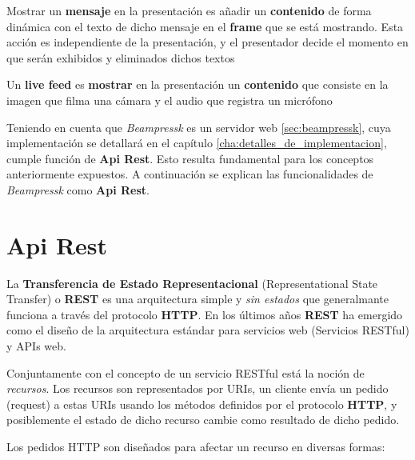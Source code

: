 	\begin{definition}
	\label{def:message}
		Mostrar un \textbf{mensaje} en la presentación es añadir un \textbf{contenido} de forma dinámica con el texto de dicho mensaje en el \textbf{frame} que se está mostrando. Esta acción es independiente de la presentación, y el presentador decide el momento en que serán exhibidos y eliminados dichos textos
	\end{definition}

	\begin{definition}
		Un \textbf{live feed} es \textbf{mostrar} en la presentación un \textbf{contenido} que consiste en la imagen que filma una cámara y el audio que registra un micrófono
	\end{definition}

 	Teniendo en cuenta que \textit{Beampressk} es un servidor web \ref{sec:beampressk}, cuya implementación se detallará en el capítulo \ref{cha:detalles_de_implementacion}, cumple función de \textbf{Api Rest}. Esto resulta fundamental para los conceptos anteriormente expuestos. A continuación se explican las funcionalidades de \textit{Beampressk} como \textbf{Api Rest}.
	

	\section{Api Rest} %
	\label{sec:api_rest}
		La \textbf{Transferencia de Estado Representacional} (Representational State Transfer) o \textbf{REST} es una arquitectura simple y \textit{sin estados} que generalmante funciona a través del protocolo \textbf{HTTP}. En los últimos años \textbf{REST} ha emergido como el diseño de la arquitectura estándar para servicios web (Servicios RESTful) y APIs web.

		Conjuntamente con el concepto de un servicio RESTful está la noción de \textit{recursos}. Los recursos son representados por URIs, un cliente envía un pedido (request) a estas URIs usando los métodos definidos por el protocolo \textbf{HTTP}, y posiblemente el estado de dicho recurso cambie como resultado de dicho pedido.

		Los pedidos HTTP son diseñados para afectar un recurso en diversas formas:

